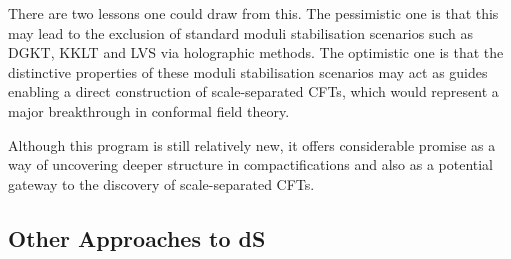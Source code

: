 \begin{itemize}
There are two lessons one could draw from this. The pessimistic one is that this may lead to the exclusion of standard moduli stabilisation scenarios such as DGKT, KKLT and LVS via holographic methods. The optimistic one is that the distinctive properties of these moduli stabilisation scenarios may act as guides enabling a direct construction of scale-separated CFTs, which would represent a major breakthrough in conformal field theory.

\end{itemize}

Although this program is still relatively new, it offers considerable promise as a way of uncovering deeper structure in compactifications and also as a potential gateway to the discovery of scale-separated CFTs.



 
\subsection{Other Approaches to dS}

